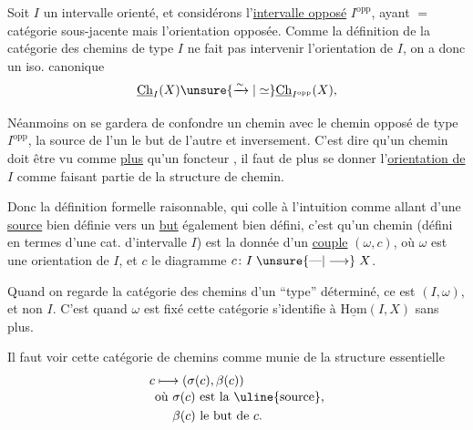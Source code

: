 Soit $I$ un intervalle orienté, et considérons l'\uline{intervalle opposé} $I^{\mathrm{opp}}$, ayant $=$ catégorie sous-jacente mais l'orientation opposée.  Comme la définition de la  catégorie des chemins de type $I$ ne fait pas intervenir l'orientation de $I$, on a donc un iso. canonique
\[ \underline{\mathrm{Ch}}_I(X) \unsure{\xrightarrow{\sim}|\simeq} \underline{\mathrm{Ch}}_{I^{\mathrm{opp}}}(X), \]

Néanmoins on se gardera de  confondre un chemin  avec le chemin opposé de type $I^{\mathrm{opp}}$, la source de l'un  le but de l'autre et inversement. C'est dire qu'un chemin doit être vu comme \uline{plus} qu'un  foncteur
,
il faut de plus se donner l'\uline{orientation de} $I$ comme faisant partie de la structure de chemin.

Donc la définition formelle raisonnable, qui colle à l'intuition  comme allant d'une \uline{source} bien définie vers un \uline{but} également bien défini, c'est qu'un chemin (défini en termes d'une cat. d'intervalle $I$) est la donnée d'un \uline{couple} $(\omega,c)$, où $\omega$ est une orientation de $I$, et $c$ le diagramme $c\colon I\mathrel{\unsure{\text{---}|\longrightarrow}}X$.

Quand on regarde la catégorie des chemins d'un ``type'' déterminé, ce  est $(I,\omega)$, et non $I$. C'est quand $\omega$ est fixé    cette catégorie s'identifie  à  $\underline{\mathrm{Hom}}(I,X)$ sans plus.

Il faut voir cette catégorie de chemins comme munie de la structure essentielle
\[ \begin{aligned} c&\longmapsto(\sigma(c),\beta(c))\\[-2pt] &\text{où }\sigma(c)\text{ est la \uline{source},}\\ &\phantom{\text{où }}\beta(c)\text{ le but de }c. \end{aligned} \]

